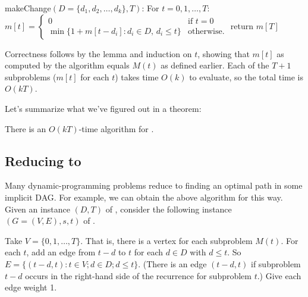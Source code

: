 \begin{myframed}
  \begin{steps}
  \item[] \textsf{makeChange}$(D=\{d_1, d_2, \ldots, d_k\}, T)$:
    \step For $t=0,1,\ldots, T$:
    \step~~~$m[t] = \begin{cases}
      0 & \text{if } t=0 \\
      \min\{ 1 + m[t-d_i] : d_i \in D,\, d_i \le t\} & \text{otherwise.}
    \end{cases}$
    \step return $m[T]$
  \end{steps}
\end{myframed}

Correctness follows by the lemma and induction on $t$,
showing that $m[t]$ as computed by the algorithm equals $M(t)$
as defined earlier.
Each of the $T+1$ subproblems ($m[t]$ for each $t$)
takes time $O(k)$ to evaluate,
so the total time is $O(kT)$.

Let's summarize what we've figured out in a theorem:

\begin{theorem}
  There is an $O(kT)$-time algorithm for .
\end{theorem}
\medskip


\subsection{Reducing to }\label{dp: sec: reducing to shortest path in a DAG}
Many dynamic-programming problems reduce to finding an optimal path in some implicit DAG.
For example, we can obtain the above algorithm for  this way.
Given an instance $(D, T)$ of  ,
consider the following instance $(G=(V,E), s, t)$ of .

Take $V=\{0,1,\ldots, T\}$.  That is, there is a vertex for each subproblem $M(t)$.
For each $t$, add an edge from $t-d$ to $t$ for each $d\in D$ with $d\le t$.
So $E= \{(t-d, t) : t\in V; d\in D; d\le t\}$.
(There is an edge $(t-d, t)$
if subproblem $t-d$ occurs in the right-hand side of the recurrence
for subproblem $t$.)
Give each edge weight 1.


